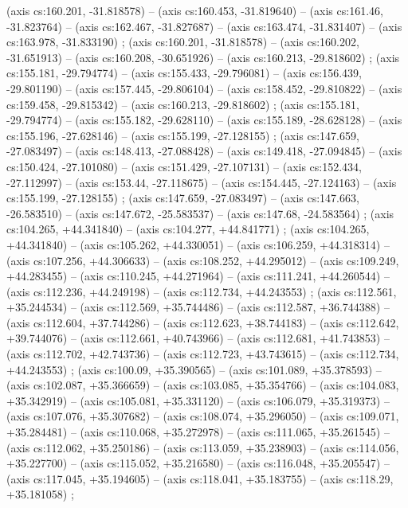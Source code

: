     (axis cs:160.201,    -31.818578) --  (axis cs:160.453,    -31.819640) --  (axis cs:161.46,    -31.823764) --  (axis cs:162.467,    -31.827687) --  (axis cs:163.474,    -31.831407) --  (axis cs:163.978,    -31.833190) ;
    (axis cs:160.201,    -31.818578) --  (axis cs:160.202,    -31.651913) --  (axis cs:160.208,    -30.651926) --  (axis cs:160.213,    -29.818602) ;
    (axis cs:155.181,    -29.794774) --  (axis cs:155.433,    -29.796081) --  (axis cs:156.439,    -29.801190) --  (axis cs:157.445,    -29.806104) --  (axis cs:158.452,    -29.810822) --  (axis cs:159.458,    -29.815342) --  (axis cs:160.213,    -29.818602) ;
    (axis cs:155.181,    -29.794774) --  (axis cs:155.182,    -29.628110) --  (axis cs:155.189,    -28.628128) --  (axis cs:155.196,    -27.628146) --  (axis cs:155.199,    -27.128155) ;
    (axis cs:147.659,    -27.083497) --  (axis cs:148.413,    -27.088428) --  (axis cs:149.418,    -27.094845) --  (axis cs:150.424,    -27.101080) --  (axis cs:151.429,    -27.107131) --  (axis cs:152.434,    -27.112997) --  (axis cs:153.44,    -27.118675) --  (axis cs:154.445,    -27.124163) --  (axis cs:155.199,    -27.128155) ;
    (axis cs:147.659,    -27.083497) --  (axis cs:147.663,    -26.583510) --  (axis cs:147.672,    -25.583537) --  (axis cs:147.68,    -24.583564) ;
    (axis cs:104.265,    +44.341840) --  (axis cs:104.277,    +44.841771) ;
    (axis cs:104.265,    +44.341840) --  (axis cs:105.262,    +44.330051) --  (axis cs:106.259,    +44.318314) --  (axis cs:107.256,    +44.306633) --  (axis cs:108.252,    +44.295012) --  (axis cs:109.249,    +44.283455) --  (axis cs:110.245,    +44.271964) --  (axis cs:111.241,    +44.260544) --  (axis cs:112.236,    +44.249198) --  (axis cs:112.734,    +44.243553) ;
    (axis cs:112.561,    +35.244534) --  (axis cs:112.569,    +35.744486) --  (axis cs:112.587,    +36.744388) --  (axis cs:112.604,    +37.744286) --  (axis cs:112.623,    +38.744183) --  (axis cs:112.642,    +39.744076) --  (axis cs:112.661,    +40.743966) --  (axis cs:112.681,    +41.743853) --  (axis cs:112.702,    +42.743736) --  (axis cs:112.723,    +43.743615) --  (axis cs:112.734,    +44.243553) ;
    (axis cs:100.09,    +35.390565) --  (axis cs:101.089,    +35.378593) --  (axis cs:102.087,    +35.366659) --  (axis cs:103.085,    +35.354766) --  (axis cs:104.083,    +35.342919) --  (axis cs:105.081,    +35.331120) --  (axis cs:106.079,    +35.319373) --  (axis cs:107.076,    +35.307682) --  (axis cs:108.074,    +35.296050) --  (axis cs:109.071,    +35.284481) --  (axis cs:110.068,    +35.272978) --  (axis cs:111.065,    +35.261545) --  (axis cs:112.062,    +35.250186) --  (axis cs:113.059,    +35.238903) --  (axis cs:114.056,    +35.227700) --  (axis cs:115.052,    +35.216580) --  (axis cs:116.048,    +35.205547) --  (axis cs:117.045,    +35.194605) --  (axis cs:118.041,    +35.183755) --  (axis cs:118.29,    +35.181058) ;
